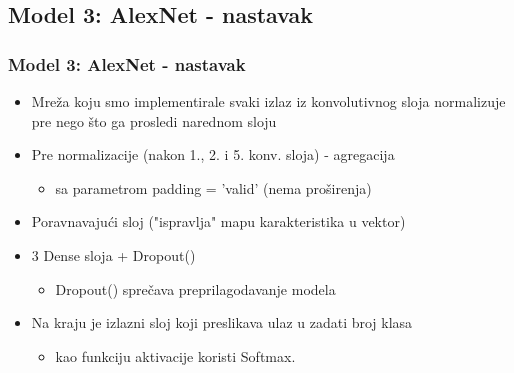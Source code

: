 \documentclass{beamer}
\begin{document}
\subsection{Model 3: AlexNet - nastavak}
\begin{frame}
\frametitle{Model 3: AlexNet - nastavak}

\begin{itemize}
\item Mreža koju smo implementirale svaki izlaz iz konvolutivnog sloja normalizuje pre nego što ga prosledi narednom sloju
\item Pre normalizacije (nakon 1., 2. i 5. konv. sloja) - agregacija
\begin{itemize}
\item sa parametrom padding = 'valid' (nema proširenja)
\end{itemize}
\item Poravnavajući sloj ("ispravlja" mapu karakteristika u vektor)
\item 3 Dense sloja + Dropout()
\begin{itemize}
\item Dropout() sprečava preprilagodavanje modela
\end{itemize}
\item Na kraju je izlazni sloj koji preslikava ulaz u zadati broj klasa
\begin{itemize}
\item kao funkciju aktivacije koristi Softmax.
\end{itemize}
\end{itemize}


\end{frame}
\end{document}
